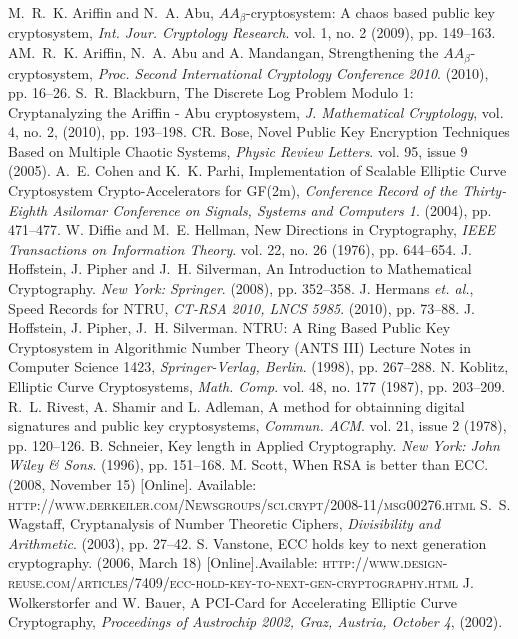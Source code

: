 \documentclass{llncs}
\begin{document}
\begin{thebibliography}{[AA1]}
 M.~R.~K. Ariffin and N.~A. Abu, $AA_\beta$-cryptosystem: A chaos based public key cryptosystem, \emph{Int. Jour. Cryptology Research}. vol. 1, no. 2 (2009), pp. 149--163.
 AM.~R.~K. Ariffin, N.~A. Abu and A. Mandangan, Strengthening the $AA_\beta$-cryptosystem, \emph{Proc. Second International Cryptology Conference 2010}. (2010), pp. 16--26.
 S.~R. Blackburn, The Discrete Log Problem Modulo 1: Cryptanalyzing
the Ariffin - Abu cryptosystem, \emph{J. Mathematical Cryptology},
vol. 4, no. 2, (2010), pp. 193--198.
 CR. Bose, Novel Public Key Encryption Techniques Based on Multiple Chaotic Systems, \emph{Physic Review Letters}. vol. 95, issue 9 (2005).
 A.~E. Cohen and K.~K. Parhi, Implementation of Scalable Elliptic Curve Cryptosystem Crypto-Accelerators for GF(2m), \emph{Conference Record of the Thirty-Eighth Asilomar Conference on Signals, Systems and Computers 1}. (2004), pp. 471--477.
 W. Diffie and M.~E. Hellman, New Directions in Cryptography, \emph{IEEE Transactions on Information Theory}. vol. 22, no. 26 (1976), pp. 644--654.
 J. Hoffstein, J. Pipher and J.~H. Silverman, An Introduction to Mathematical Cryptography. \emph{New York: Springer}. (2008), pp. 352--358.
 J. Hermans \textit{et. al.}, Speed Records for NTRU, \emph{CT-RSA 2010, LNCS 5985}. (2010), pp. 73--88.
 J. Hoffstein, J. Pipher, J.~H. Silverman. NTRU: A Ring Based Public Key Cryptosystem in Algorithmic Number Theory (ANTS III) Lecture Notes in Computer Science 1423, \emph{Springer-Verlag, Berlin}. (1998), pp. 267--288.
 N. Koblitz, Elliptic Curve Cryptosystems, \emph{Math. Comp}. vol. 48, no. 177 (1987), pp. 203--209.
 R.~L. Rivest, A. Shamir and L. Adleman, A method for obtainning digital signatures and public key cryptosystems, \emph{Commun. ACM}. vol. 21, issue 2 (1978), pp. 120--126.
 B. Schneier, Key length in Applied Cryptography. \emph{New York: John Wiley \& Sons}. (1996), pp. 151--168.
 M. Scott, When RSA is better than ECC. (2008, November 15) [Online]. Available: \textsc{http://www.derkeiler.com/Newsgroups/sci.crypt/2008-11/msg00276.html}
 S.~S. Wagstaff, Cryptanalysis of Number Theoretic Ciphers, \emph{Divisibility and Arithmetic}. (2003), pp. 27--42.
 S. Vanstone, ECC holds key to next generation cryptography. (2006, March 18) [Online].Available:
\textsc{http://www.design-reuse.com/articles/7409/ecc-hold-key-to-next-gen-cryptography.html}
 J. Wolkerstorfer and W. Bauer, A PCI-Card for Accelerating Elliptic Curve Cryptography, \emph{Proceedings of Austrochip 2002, Graz, Austria, October 4}, (2002).
\end{thebibliography}
 
\end{document}
